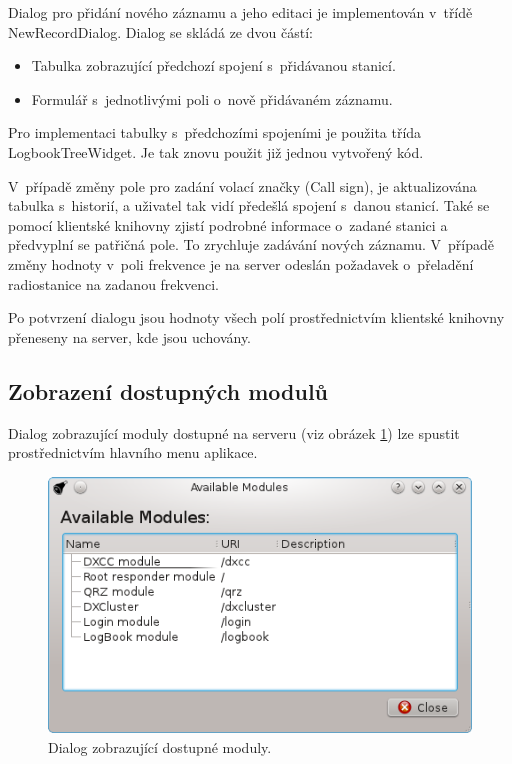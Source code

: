 Dialog pro přidání nového záznamu a jeho editaci je implementován v~třídě NewRecordDialog. Dialog se skládá ze dvou částí:

\begin{itemize}
\item Tabulka zobrazující předchozí spojení s~přidávanou stanicí.
\item Formulář s~jednotlivými poli o~nově přidávaném záznamu.
\end{itemize}

Pro implementaci tabulky s~předchozími spojeními je použita třída
LogbookTreeWidget. Je tak znovu použit již jednou vytvořený
kód.

V~případě změny pole pro zadání volací značky (Call sign), je aktualizována tabulka s~historií, a uživatel tak vidí předešlá 
spojení s~danou stanicí. Také se pomocí klientské knihovny zjistí podrobné informace o~zadané stanici a předvyplní se patřičná
pole. To zrychluje zadávání nových záznamu. V~případě změny hodnoty v~poli frekvence je na server odeslán požadavek o~přeladění
radiostanice na zadanou frekvenci.

Po potvrzení dialogu jsou hodnoty všech polí prostřednictvím klientské knihovny přeneseny na server, kde jsou uchovány.

\subsection{Zobrazení dostupných modulů}

Dialog zobrazující moduly dostupné na serveru (viz obrázek \ref{fig:moduly_dialog}) lze spustit prostřednictvím hlavního menu aplikace.

\begin{figure}[h]
\centering
\includegraphics[trim=0cm 0cm 0cm 0cm, scale=1]{fig/ham6}
\caption{Dialog zobrazující dostupné moduly.}
\label{fig:moduly_dialog}
\end{figure}

